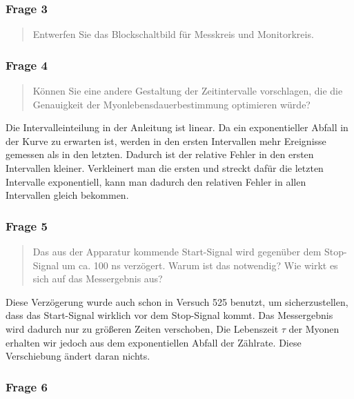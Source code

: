 \documentclass[11pt, ngerman, fleqn, DIV=15, headinclude, BCOR=2cm]{scrreprt}
\begin{document}

\subsubsection{Frage 3}

\begin{quote}
    Entwerfen Sie das Blockschaltbild für Messkreis und Monitorkreis.
\end{quote}


\subsubsection{Frage 4}

\begin{quote}
    Können Sie eine andere Gestaltung der Zeitintervalle vorschlagen, die die
    Genauigkeit der Myonlebensdauerbestimmung optimieren würde?
\end{quote}

Die Intervalleinteilung in der Anleitung ist linear. Da ein exponentieller
Abfall in der Kurve zu erwarten ist, werden in den ersten Intervallen mehr
Ereignisse gemessen als in den letzten. Dadurch ist der relative Fehler in den
ersten Intervallen kleiner. Verkleinert man die ersten und streckt dafür die
letzten Intervalle exponentiell, kann man dadurch den relativen Fehler in allen
Intervallen gleich bekommen.

\subsubsection{Frage 5}

\begin{quote}
    Das aus der Apparatur kommende Start-Signal wird gegenüber dem Stop-Signal
    um ca. 100 ns verzögert. Warum ist das notwendig? Wie wirkt es sich auf das
    Messergebnis aus?
\end{quote}

Diese Verzögerung wurde auch schon in Versuch 525 benutzt, um sicherzustellen,
dass das Start-Signal wirklich vor dem Stop-Signal kommt. Das Messergebnis wird
dadurch nur zu größeren Zeiten verschoben, Die Lebenszeit $\tau$ der Myonen
erhalten wir jedoch aus dem exponentiellen Abfall der Zählrate. Diese
Verschiebung ändert daran nichts.

\subsubsection{Frage 6}
\end{document}
